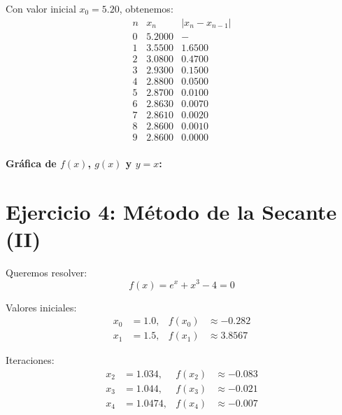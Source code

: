 \documentclass[12pt]{article}
\begin{document}
Con valor inicial \(x_0 = 5.20\), obtenemos:
\[
\begin{array}{c|c|c}
    n & x_n & |x_n - x_{n-1}| \\ \hline
    0 & 5.2000 & - \\
    1 & 3.5500 & 1.6500 \\
    2 & 3.0800 & 0.4700 \\
    3 & 2.9300 & 0.1500 \\
    4 & 2.8800 & 0.0500 \\
    5 & 2.8700 & 0.0100 \\
    6 & 2.8630 & 0.0070 \\
    7 & 2.8610 & 0.0020 \\
    8 & 2.8600 & 0.0010 \\
    9 & 2.8600 & 0.0000 \\
\end{array}
\]

\bigskip
\textbf{Gráfica de \(f(x)\), \(g(x)\) y \(y = x\):}
\begin{center}
\end{center}

\section*{Ejercicio 4: Método de la Secante (II)}

Queremos resolver:
\[
    f(x) = e^x + x^3 - 4 = 0
\]

Valores iniciales:
\begin{align*}
    x_0 &= 1.0, & f(x_0) &\approx -0.282 \\
    x_1 &= 1.5, & f(x_1) &\approx 3.8567
\end{align*}

Iteraciones:
\begin{align*}
    x_2 &= 1.034, & f(x_2) &\approx -0.083 \\
    x_3 &= 1.044, & f(x_3) &\approx -0.021 \\
    x_4 &= 1.0474, & f(x_4) &\approx -0.007
\end{align*}
\end{document}
